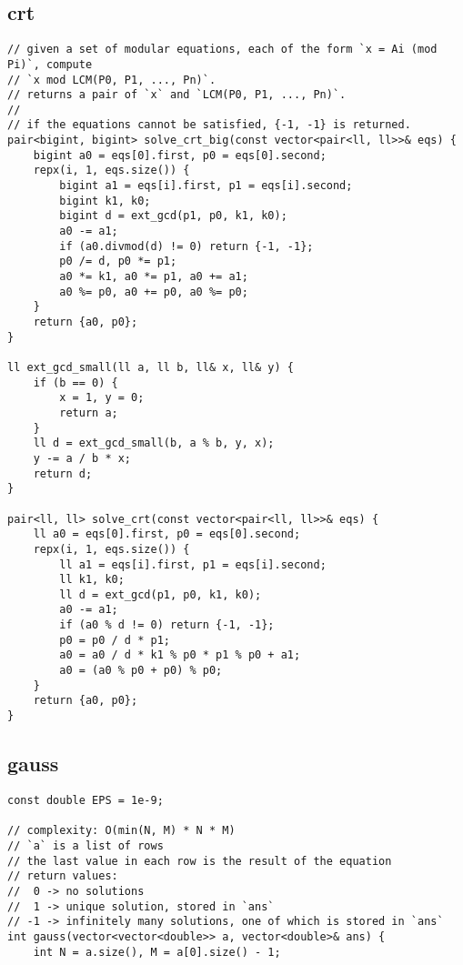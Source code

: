 \documentclass[twoside]{article}
\begin{document}
\begin{multicols*}{2}
{\subsection*{crt}
}
\begin{verbatim}
// given a set of modular equations, each of the form `x = Ai (mod Pi)`, compute
// `x mod LCM(P0, P1, ..., Pn)`.
// returns a pair of `x` and `LCM(P0, P1, ..., Pn)`.
//
// if the equations cannot be satisfied, {-1, -1} is returned.
pair<bigint, bigint> solve_crt_big(const vector<pair<ll, ll>>& eqs) {
    bigint a0 = eqs[0].first, p0 = eqs[0].second;
    repx(i, 1, eqs.size()) {
        bigint a1 = eqs[i].first, p1 = eqs[i].second;
        bigint k1, k0;
        bigint d = ext_gcd(p1, p0, k1, k0);
        a0 -= a1;
        if (a0.divmod(d) != 0) return {-1, -1};
        p0 /= d, p0 *= p1;
        a0 *= k1, a0 *= p1, a0 += a1;
        a0 %= p0, a0 += p0, a0 %= p0;
    }
    return {a0, p0};
}

ll ext_gcd_small(ll a, ll b, ll& x, ll& y) {
    if (b == 0) {
        x = 1, y = 0;
        return a;
    }
    ll d = ext_gcd_small(b, a % b, y, x);
    y -= a / b * x;
    return d;
}

pair<ll, ll> solve_crt(const vector<pair<ll, ll>>& eqs) {
    ll a0 = eqs[0].first, p0 = eqs[0].second;
    repx(i, 1, eqs.size()) {
        ll a1 = eqs[i].first, p1 = eqs[i].second;
        ll k1, k0;
        ll d = ext_gcd(p1, p0, k1, k0);
        a0 -= a1;
        if (a0 % d != 0) return {-1, -1};
        p0 = p0 / d * p1;
        a0 = a0 / d * k1 % p0 * p1 % p0 + a1;
        a0 = (a0 % p0 + p0) % p0;
    }
    return {a0, p0};
}
\end{verbatim}

{
\subsection*{gauss}
}
\begin{verbatim}
const double EPS = 1e-9;

// complexity: O(min(N, M) * N * M)
// `a` is a list of rows
// the last value in each row is the result of the equation
// return values:
//  0 -> no solutions
//  1 -> unique solution, stored in `ans`
// -1 -> infinitely many solutions, one of which is stored in `ans`
int gauss(vector<vector<double>> a, vector<double>& ans) {
    int N = a.size(), M = a[0].size() - 1;


\end{verbatim}
\end{multicols*}
\end{document}
